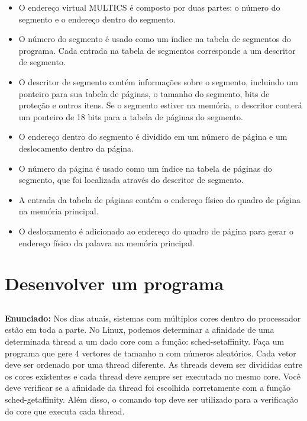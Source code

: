\documentclass{article}
\begin{document}
\begin{itemize}
  \item O endereço virtual MULTICS é composto por duas partes: o número do segmento e o endereço dentro do segmento.
  \item O número do segmento é usado como um índice na tabela de segmentos do programa. Cada entrada na tabela de segmentos corresponde a um descritor de segmento.
  \item O descritor de segmento contém informações sobre o segmento, incluindo um ponteiro para sua tabela de páginas, o tamanho do segmento, bits de proteção e outros itens. Se o segmento estiver na memória, o descritor conterá um ponteiro de 18 bits para a tabela de páginas do segmento.
  \item O endereço dentro do segmento é dividido em um número de página e um deslocamento dentro da página.
  \item O número da página é usado como um índice na tabela de páginas do segmento, que foi localizada através do descritor de segmento.
  \item A entrada da tabela de páginas contém o endereço físico do quadro de página na memória principal.
  \item O deslocamento é adicionado ao endereço do quadro de página para gerar o endereço físico da palavra na memória principal.
\end{itemize}

\section{Desenvolver um programa}

\subsection{}
\textbf{Enunciado:} Nos dias atuais, sistemas com múltiplos cores dentro do processador estão em toda a parte. No Linux, podemos determinar a afinidade de uma determinada thread a um dado core com a função: sched-setaffinity. Faça um programa que gere 4 vertores de tamanho n com números aleatórios. Cada vetor deve ser ordenado por uma thread diferente. As threads devem ser divididas entre os cores existentes e cada thread deve sempre ser executada no mesmo core. Você deve verificar se a afinidade da thread foi escolhida corretamente com a função sched-getaffinity. Além disso, o comando top deve
ser utilizado para a verificação do core que executa cada thread. \newline
\end{document}
